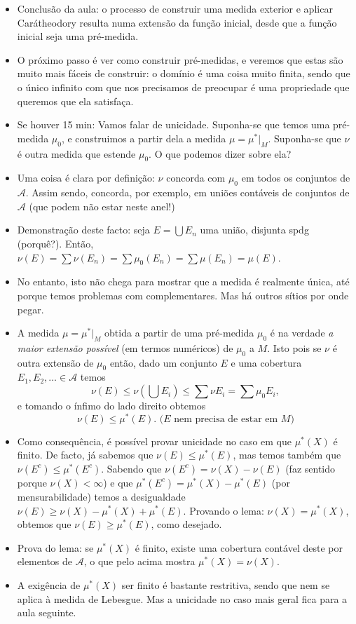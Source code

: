 \documentclass{article}
\begin{document}
\begin{itemize}
\begin{itemize}
\end{itemize}
\item Conclusão da aula: o processo de construir uma medida exterior e aplicar Carátheodory resulta numa extensão da função inicial, desde que a função inicial seja uma pré-medida.
\item O próximo passo é ver como construir pré-medidas, e veremos que estas são muito mais fáceis de construir: o domínio é uma coisa muito finita, sendo que o único infinito com que nos precisamos de preocupar é uma propriedade que queremos que ela satisfaça.
\item Se houver 15 min: Vamos falar de unicidade. Suponha-se que temos uma pré-medida $\mu_0$, e construimos a partir dela a medida $\mu = \mu^*|_M$. Suponha-se que $\nu$ é outra medida que estende $\mu_0$. O que podemos dizer sobre ela?
\item Uma coisa é clara por definição: $\nu$ concorda com $\mu_0$ em todos os conjuntos de $\mathcal{A}$. Assim sendo, concorda, por exemplo, em uniões contáveis de conjuntos de $\mathcal{A}$ (que podem não estar neste anel!)
\item Demonstração deste facto: seja $E = \bigcup E_n$ uma união, disjunta spdg (porquê?). Então, $\nu(E) = \sum \nu(E_n) = \sum \mu_0(E_n) = \sum \mu(E_n) = \mu(E)$.
\item No entanto, isto não chega para mostrar que a medida é realmente única, até porque temos problemas com complementares. Mas há outros sítios por onde pegar.
\item A medida $\mu = \mu^*|_M$ obtida a partir de uma pré-medida $\mu_0$ é na verdade \emph{a maior extensão possível} (em termos numéricos) de $\mu_0$ a $M$. Isto pois se $\nu$ é outra extensão de $\mu_0$ então, dado um conjunto $E$ e uma cobertura $E_1, E_2, \dots \in \mathcal{A}$ temos
\[\nu(E) \leq \nu(\bigcup E_i) \leq \sum \nu E_i = \sum \mu_0 E_i,\]
e tomando o ínfimo do lado direito obtemos
\[\nu(E) \leq \mu^*(E). \text{ ($E$ nem precisa de estar em $M$)}\]
\item Como consequência, é possível provar unicidade no caso em que $\mu^*(X)$ é finito. De facto, já sabemos que $\nu(E) \leq \mu^*(E)$, mas temos também que $\nu(E^c) \leq \mu^*(E^c)$. Sabendo que $\nu(E^c) = \nu(X) - \nu(E)$ (faz sentido porque $\nu(X) < \infty$) e que $\mu^*(E^c) = \mu^*(X) - \mu^*(E)$ (por mensurabilidade) temos a desigualdade $\nu(E) \geq \nu(X) - \mu^*(X) + \mu^*(E)$. Provando o lema: $\nu(X) = \mu^*(X)$, obtemos que $\nu(E) \geq \mu^*(E)$, como desejado.
\item Prova do lema: se $\mu^*(X)$ é finito, existe uma cobertura contável deste por elementos de $\mathcal{A}$, o que pelo acima mostra $\mu^*(X) = \nu(X)$.
\item A exigência de $\mu^*(X)$ ser finito é bastante restritiva, sendo que nem se aplica à medida de Lebesgue. Mas a unicidade no caso mais geral fica para a aula seguinte.
\end{itemize}
\end{document}
